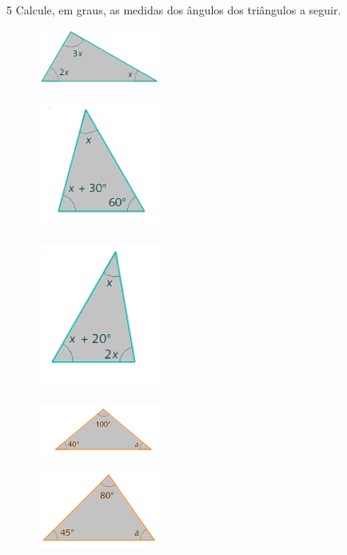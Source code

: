 {{{\num{5} Calcule, em graus, as medidas dos ângulos dos triângulos a seguir.

\begin{escolha}
\item
\begin{figure}[H]
\centering\includegraphics[width=4cm]{./imgSAEB_8_MAT/media/image24.png}
\end{figure}
\item
\begin{figure}[H]
\centering\includegraphics[width=4cm]{./imgSAEB_8_MAT/media/image25.png}
\end{figure}
\item
\begin{figure}[H]
\centering\includegraphics[width=4cm]{./imgSAEB_8_MAT/media/image26.png}
\end{figure}
\item
\begin{figure}[H]
\centering\includegraphics[width=4cm]{./imgSAEB_8_MAT/media/image27.png}
\end{figure}
\item
\begin{figure}[H]
\centering\includegraphics[width=4cm]{./imgSAEB_8_MAT/media/image28.png}

\end{figure}
\end{escolha}}}}
